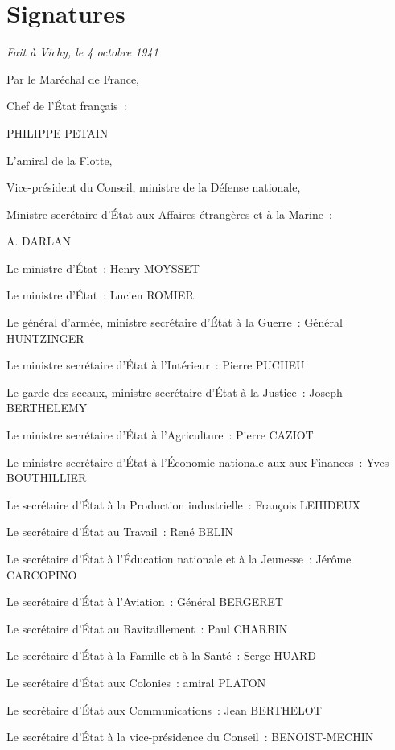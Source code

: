 \documentclass[french,twoside]{book} %
\begin{document}
\section[Signatures]{Signatures}
\noindent \emph{Fait à Vichy, le 4 octobre 1941}\par
Par le Maréchal de France,\par
Chef de l’État français :\par
PHILIPPE PETAIN\par
L’amiral de la Flotte,\par
Vice-président du Conseil, ministre de la Défense nationale,\par
Ministre secrétaire d’État aux Affaires étrangères et à la Marine :\par
A. DARLAN\par
Le ministre d’État : Henry MOYSSET\par
Le ministre d’État : Lucien ROMIER\par
Le général d’armée, ministre secrétaire d’État à la Guerre : Général HUNTZINGER\par
Le ministre secrétaire d’État à l’Intérieur : Pierre PUCHEU\par
Le garde des sceaux, ministre secrétaire d’État à la Justice : Joseph BERTHELEMY\par
Le ministre secrétaire d’État à l’Agriculture : Pierre CAZIOT\par
Le ministre secrétaire d’État à l’Économie nationale aux aux Finances : Yves BOUTHILLIER\par
Le secrétaire d’État à la Production industrielle : François LEHIDEUX\par
Le secrétaire d’État au Travail : René BELIN\par
Le secrétaire d’État à l’Éducation nationale et à la Jeunesse : Jérôme CARCOPINO\par
Le secrétaire d’État à l’Aviation : Général BERGERET\par
Le secrétaire d’État au Ravitaillement : Paul CHARBIN\par
Le secrétaire d’État à la Famille et à la Santé : Serge HUARD\par
Le secrétaire d’État aux Colonies : amiral PLATON\par
Le secrétaire d’État aux Communications : Jean BERTHELOT\par
Le secrétaire d’État à la vice-présidence du Conseil : BENOIST-MECHIN
 


\ifbooklet
  \newpage\null\thispagestyle{empty}\newpage
\fi
\end{document}
